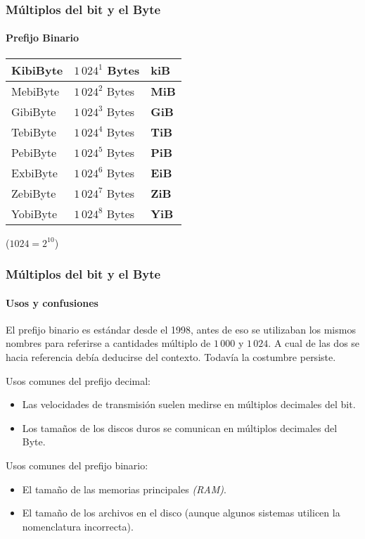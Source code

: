 \documentclass[11pt,a4paper,spanish]{beamer}
\begin{document}
\begin{frame}

\frametitle{Múltiplos del bit y el Byte}

\framesubtitle{Prefijo Binario}

\centering
\begin{tabular}{l l l}
    KibiByte & $1\,024^{1}$ Bytes & \textbf{kiB}\\ \hline
    MebiByte & $1\,024^{2}$ Bytes & \textbf{MiB}\\ \hline
    GibiByte & $1\,024^{3}$ Bytes & \textbf{GiB}\\ \hline
    TebiByte & $1\,024^{4}$ Bytes & \textbf{TiB}\\ \hline
    PebiByte & $1\,024^{5}$ Bytes & \textbf{PiB}\\ \hline
    ExbiByte & $1\,024^{6}$ Bytes & \textbf{EiB}\\ \hline
    ZebiByte & $1\,024^{7}$ Bytes & \textbf{ZiB}\\ \hline
    YobiByte & $1\,024^{8}$ Bytes & \textbf{YiB}\\
\end{tabular}

\tiny ($1024 = 2^{10}$)
\end{frame}

\begin{frame}

\frametitle{Múltiplos del bit y el Byte}

\framesubtitle{Usos y confusiones}

El prefijo binario es estándar desde el 1998, antes de eso se utilizaban los
    mismos nombres para referirse a cantidades múltiplo de $1\,000$ y
    $1\,024$. A cual de las dos se hacia referencia debía deducirse del
    contexto. Todavía la costumbre persiste.

\pause
Usos comunes del prefijo decimal:

\begin{itemize}
    \item Las velocidades de transmisión suelen medirse en múltiplos decimales del bit.
    \item Los tamaños de los discos duros se comunican en múltiplos decimales
        del Byte.
\end{itemize}

\pause
Usos comunes del prefijo binario:

\begin{itemize}
    \item El tamaño de las memorias principales \emph{(RAM)}.
    \item El tamaño de los archivos en el disco (aunque algunos sistemas
        utilicen la nomenclatura incorrecta).
\end{itemize}

\end{frame}
\end{document}

